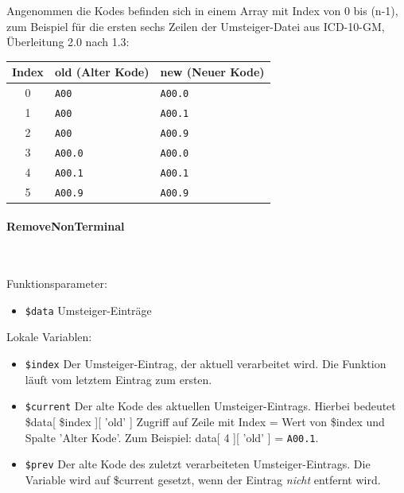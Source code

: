 Angenommen die Kodes befinden sich in einem Array mit Index von 0 bis (n-1), zum Beispiel für die ersten sechs Zeilen der Umsteiger-Datei aus ICD-10-GM, Überleitung 2.0 nach 1.3: 

\begingroup
\renewcommand{\arraystretch}{1.2}
\setlength{\tabcolsep}{12pt}
\begin{tabular}{cll}
Index & old (Alter Kode) & new (Neuer Kode) \\
\hline
0 & \texttt{A00} & \texttt{A00.0}  \\
1 & \texttt{A00} & \texttt{A00.1} \\
2 & \texttt{A00} & \texttt{A00.9} \\
3 & \texttt{A00.0} & \texttt{A00.0} \\
4 & \texttt{A00.1} & \texttt{A00.1} \\
5 & \texttt{A00.9} & \texttt{A00.9} \\
\end{tabular}
\endgroup

\paragraph*{RemoveNonTerminal} \

Funktionsparameter:

\begin{itemize}
\item \texttt{\$data} \newline Umsteiger-Einträge
\end{itemize}

Lokale Variablen:

\begin{itemize}
\item \texttt{\$index}
  \newline Der Umsteiger-Eintrag, der aktuell verarbeitet wird.
  \newline Die Funktion läuft vom letztem Eintrag zum ersten.
\item \texttt{\$current}
  \newline Der alte Kode des aktuellen Umsteiger-Eintrags.
  \newline Hierbei bedeutet \$data[ \$index ][ 'old' ] Zugriff auf Zeile mit Index = Wert von \$index und Spalte 'Alter Kode'. Zum Beispiel: data[ 4 ][ 'old' ] = \texttt{A00.1}.
\item \texttt{\$prev}
  \newline Der alte Kode des zuletzt verarbeiteten Umsteiger-Eintrags.
  \newline Die Variable wird auf \$current gesetzt, wenn der Eintrag \emph{nicht} entfernt wird.
\end{itemize}

